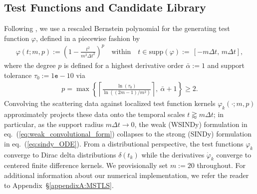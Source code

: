 \documentclass[journal=gmj]{CUP-JNL-DTM}%
\theoremstyle{definition}
\numberwithin{equation}{section}
\begin{document}

\subsection{Test Functions and Candidate Library}\label{subsec:candidate_library}
Following \cite{Messenger.Bortz2021JournalofComputationalPhysics}, we use a rescaled Bernstein polynomial for the generating test function $\varphi$, defined in a piecewise fashion by \begin{align*}
    \varphi(t;m,p) := \left(1 - \frac{t^2}{m^2\Delta{t}^2} \right)^{p}
    \quad \text{within} \quad
    t \in \text{supp}(\varphi) := \, [-m\Delta{t}, \, m\Delta{t}],
\end{align*} where the degree $p$ is defined for a highest derivative order $\bar{\alpha} := 1$ and support tolerance $\tau_0 := 1\texttt{e}-10$ via \begin{align}\label{eq:test_fcn_degree}
    p = \max\left\{ \left\lceil
    \frac{\ln(\tau_0)}{\ln((2m-1)/m^2)}
    \right\rceil\!, \ \bar{\alpha} + 1 \right\} \geq 2.
\end{align} Convolving the scattering data against localized test function kernels $\varphi_k(\cdot;m,p)$ approximately projects these data onto the temporal scales $t \gtrapprox m\Delta{t}$; in particular, as the support radius $m\Delta{t} \rightarrow 0$, the weak (WSINDy) formulation in eq.~(\ref{eq:weak_convolutional_form}) collapses to the strong (SINDy) formulation in eq.~(\ref{eq:sindy_ODE}). From a distributional perspective, the test functions $\varphi_k$ converge to Dirac delta distributions $\delta(t_k)$ while the derivatives $\dot{\varphi}_k$ converge to centered finite difference kernels. We provisionally set $m := 20$ throughout. For additional information about our numerical implementation, we refer the reader to Appendix~\S\ref{appendixA:MSTLS}.

\smallskip
\end{document}
